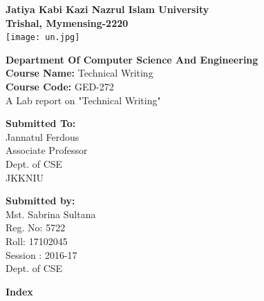 \documentclass[12pt,a4paper]{article}
\begin{document}
	
		\begin{center}
		\LARGE\textbf{Jatiya Kabi Kazi Nazrul Islam University} \\
		\Large\textbf{Trishal, Mymensing-2220}\\
		\vspace{5mm}
		\texttt{[image: un.jpg]}
			\end{center}

		\begin{center}	
			\large\textbf{Department Of Computer Science And Engineering}
			\textbf{\\Course Name: }Technical Writing\\
			\textbf{Course Code: }GED-272\\	
					{A Lab report on "Technical Writing"}\\
	\end{center}
\vspace{2cm}
\begin{flushleft}
\textbf{Submitted  To:}\\
Jannatul Ferdous\\
Associate Professor\\
Dept. of CSE\\
JKKNIU
\end{flushleft}

\begin{flushright}
\textbf{Submitted  by:}\\
 Mst. Sabrina Sultana\\
Reg. No: 5722\\
Roll: 17102045\\
Session : 2016-17\\
Dept. of CSE\\
\end{flushright}
\thispagestyle{empty}

\newpage
\begin{center}
	\large\textbf{Index}
\end{center}
\end{document}
